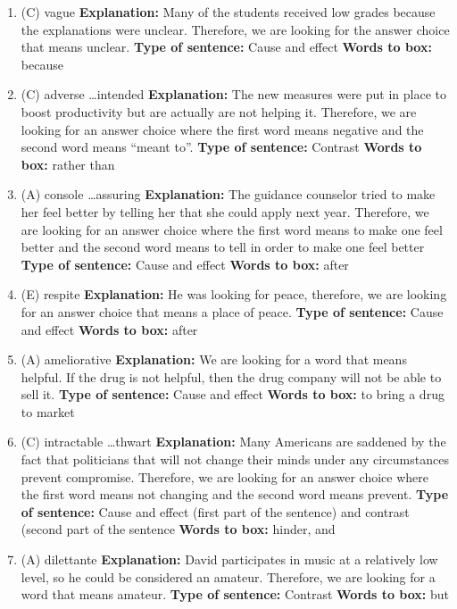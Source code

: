\begin{enumerate}
\begin{enumerate}
\item (C) vague
\textbf{Explanation:} Many of the students received low grades because the explanations were unclear. Therefore, we are looking for the answer choice that means unclear. 
\textbf{Type of sentence:} Cause and effect
\textbf{Words to box:} because

\item (C) adverse \ldots intended
\textbf{Explanation:} The new measures were put in place to boost productivity but are actually are not helping it. Therefore, we are looking for an answer choice where the first word means negative and the second word means ``meant to''.
\textbf{Type of sentence:} Contrast
\textbf{Words to box:} rather than
\item (A) console \ldots assuring
\textbf{Explanation:} The guidance counselor tried to make her feel better by telling her that she could apply next year. Therefore, we are looking for an answer choice where the first word means to make one feel better and the second word means to tell in order to make one feel better
\textbf{Type of sentence:} Cause and effect
\textbf{Words to box:} after
\item (E) respite
\textbf{Explanation:} He was looking for peace, therefore, we are looking for an answer choice that means a place of peace. 
\textbf{Type of sentence:} Cause and effect
\textbf{Words to box:} after
\item (A) ameliorative
\textbf{Explanation:} We are looking for a word that means helpful. If the drug is not helpful, then the drug company will not be able to sell it. 
\textbf{Type of sentence:} Cause and effect
\textbf{Words to box:} to bring a drug to market

\item (C) intractable \ldots thwart 
\textbf{Explanation:} Many Americans are saddened by the fact that politicians that will not change their minds under any circumstances prevent compromise. Therefore, we are looking for an answer choice where the first word means not changing and the second word means prevent.
\textbf{Type of sentence:} Cause and effect (first part of the sentence) and contrast (second part of the sentence
\textbf{Words to box:} hinder, and

\item (A) dilettante 
\textbf{Explanation:} David participates in music at a relatively low level, so he could be considered an amateur. Therefore, we are looking for a word that means amateur. 
\textbf{Type of sentence:} Contrast
\textbf{Words to box:} but


\end{enumerate}
\end{enumerate}
